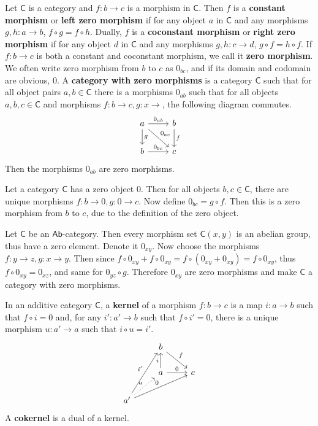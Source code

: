 \begin{defn} Let $\mathsf{C}$ is a category and $f:b\rightarrow c$ is a morphism in $\mathsf{C}$. Then $f$ is a \textbf{constant morphism} or \textbf{left zero morphism} if for any object $a$ in $\mathsf{C}$ and any morphisms $g,h:a\rightarrow b$, $f\circ g=f\circ h$. Dually, $f$ is a \textbf{coconstant morphism} or \textbf{right zero morphism} if for any object $d$ in $\mathsf{C}$ and any morphisms $g,h:c\rightarrow d$, $g\circ f=h\circ f$. If $f:b\rightarrow c$ is both a constant and coconstant morphism, we call it \textbf{zero morphism}. We often write zero morphism from $b$ to $c$ as $0_{bc}$, and if its domain and codomain are obvious, $0$. A \textbf{category with zero morphisms} is a category $\mathsf{C}$ such that for all object pairs $a,b\in \mathsf{C}$ there is a morphisms $0_{ab}$ such that for all objects $a,b,c\in \mathsf{C}$ and morphisms $f:b\rightarrow c, g:x\rightarrow$, the following diagram commutes.
\begin{equation}
\begin{tikzcd}
a\arrow[r,"0_{ab}"] \arrow[d,"g"] \arrow[rd,"0_{ac}"] & b\arrow[d,"f"]\\
b\arrow[r,"0_{bc}"]&c
\end{tikzcd}
\end{equation}
Then the morphisms $0_{ab}$ are zero morphisms.
\end{defn}

\begin{exmp}
Let a category $\mathsf{C}$ has a zero object $0$. Then for all objects $b,c\in \mathsf{C}$, there are unique morphisms $f:b\rightarrow 0, g:0\rightarrow c$. Now define $0_{bc}=g\circ f$. Then this is a zero morphism from $b$ to $c$, due to the definition of the zero object. 
\end{exmp}

\begin{exmp} Let $\mathsf{C}$ be an $\mathsf{Ab}$-category. Then every morphism set $\mathsf{C}(x,y)$ is an abelian group, thus have a zero element. Denote it $0_{xy}$. Now choose the morphisms $f:y\rightarrow z, g:x\rightarrow y$. Then since $f\circ 0_{xy}+f\circ 0_{xy}=f\circ(0_{xy}+0_{xy})=f\circ 0_{xy}$, thus $f\circ 0_{xy}=0_{xz}$, and same for $0_{yz}\circ g$. Therefore $0_{xy}$ are zero morphisms and make $\mathsf{C}$ a category with zero morphisms.
\end{exmp}

\begin{defn} In an additive category $\mathsf{C}$, a \textbf{kernel} of a morphism $f:b\rightarrow c$ is a map $i:a\rightarrow b$ such that $f\circ i=0$ and, for any $i':a'\rightarrow b$ such that $f\circ i'=0$, there is a unique morphism $u:a'\rightarrow a$ such that $i\circ u=i'$.
\begin{equation}
\begin{tikzcd}
&b\arrow{rd}{f}&\\
&a\arrow{u}{i} \arrow{r}{0}&c\\
a'\arrow{ruu}{i'}\arrow{rru}{0} \arrow[ru, "u", dotted]&&
\end{tikzcd}
\end{equation}
A \textbf{cokernel} is a dual of a kernel.
\end{defn}

